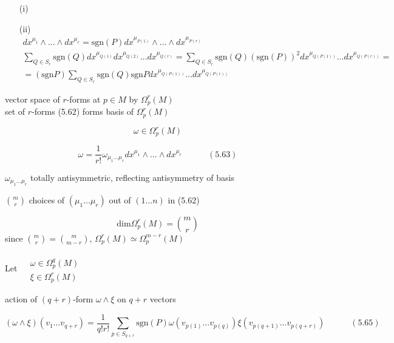 \documentclass[twoside]{amsart}
\begin{document}
\begin{enumerate}
  \item[(i)]
  \item[(ii)] \[
    \begin{gathered}
      dx^{\mu_1} \wedge \dots \wedge dx^{\mu_r} = \text{sgn}{ (P)} dx^{\mu_{P(1)} } \wedge \dots \wedge dx^{\mu_{ P(r)} } \\ 
      \sum_{ Q \in S_r} \text{sgn}{ (Q)} dx^{\mu_{Q(1) } } dx^{\mu_{Q(2) } } \ldots dx^{\mu_{Q(r)}}  = \sum_{Q \in S_r} \text{sgn}{ (Q) } ( \text{sgn}(P))^2 dx^{\mu_{Q(P(1)) }} \dots dx^{\mu_{Q(P(r)) } } = \\
       = ( \text{sgn}{ P } ) \sum_{Q \in  S_r } \text{sgn}{(Q)} \text{sgn}{ P } dx^{\mu_{Q(P(1)) }} \ldots dx^{ \mu_{Q(P(r)) } }
\end{gathered}
\]
\end{enumerate}


vector space of $r$-forms at $p\in M$ by $\Omega_p^r(M)$ \\
set of $r$-forms (5.62) forms basis of $\Omega_p^r(M)$

\[
\omega \in \Omega_p^r(M)
\]


\begin{equation}
  \omega = \frac{1}{r!} \omega_{\mu_1 \dots \mu_r} dx^{\mu_1} \wedge \dots \wedge dx^{\mu_r} \quad \quad \quad (5.63)
\end{equation}




$\omega_{\mu_1 \dots \mu_r}$ totally antisymmetric, reflecting antisymmetry of basis

$\binom{m}{r}$ choices of $(\mu_1 \dots \mu_r)$ out of $(1 \dots n)$ in (5.62)

\[
\text{dim}{ \Omega_p^r(M) } = \binom{m}{r}
\]
since $\binom{m}{r} = \binom{m}{m-r}$, $\Omega_p^r(M) \simeq \Omega_p^{m-r}(M)$

Let $\begin{aligned} & \quad \\ & \omega \in \Omega_p^q(M)  \\ & \xi \in \Omega_p^r(M) \end{aligned}$

action of $(q+r)$-form $\omega \wedge \xi $ on $q+r$ vectors 

\begin{equation}
  (\omega \wedge \xi )(v_1 \dots v_{q+r} ) = \frac{1}{q! r!} \sum_{ p \in S_{q+r}} \text{sgn}{(P)} \omega( v_{p(1)} \dots v_{p(q)} ) \xi(v_{p(q+1)} \dots v_{ p(q+r) } ) \quad \quad \quad (5.65)
\end{equation}
\end{document}
